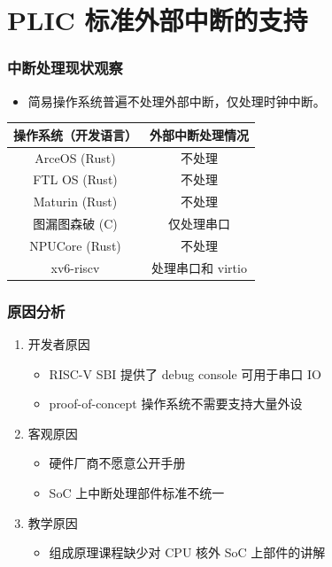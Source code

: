 \section{PLIC 标准外部中断的支持}

\begin{frame}
    \frametitle{中断处理现状观察}

    \begin{itemize}
        \item 简易操作系统普遍不处理外部中断，仅处理时钟中断。
    \end{itemize}

    \begin{table}
        \centering
        \begin{tabular}{|c|c|}
            \hline \textbf{操作系统（开发语言）} & \textbf{外部中断处理情况} \\
            \hline ArceOS (Rust)       & 不处理               \\
            \hline FTL OS (Rust)       & 不处理               \\
            \hline Maturin (Rust)      & 不处理               \\
            \hline 图漏图森破 (C)           & 仅处理串口             \\
            \hline NPUCore (Rust)      & 不处理               \\
            \hline xv6-riscv           & 处理串口和 virtio      \\
            \hline
        \end{tabular}
    \end{table}


\end{frame}

\begin{frame}
    \frametitle{原因分析}

    \begin{enumerate}
        \item 开发者原因
              \begin{itemize}
                  \item RISC-V SBI 提供了 debug console 可用于串口 IO
                  \item proof-of-concept 操作系统不需要支持大量外设
              \end{itemize}
        \item 客观原因
              \begin{itemize}
                  \item 硬件厂商不愿意公开手册
                  \item SoC 上中断处理部件标准不统一
              \end{itemize}
        \item 教学原因
              \begin{itemize}
                  \item 组成原理课程缺少对 CPU 核外 SoC 上部件的讲解
              \end{itemize}
    \end{enumerate}


\end{frame}


